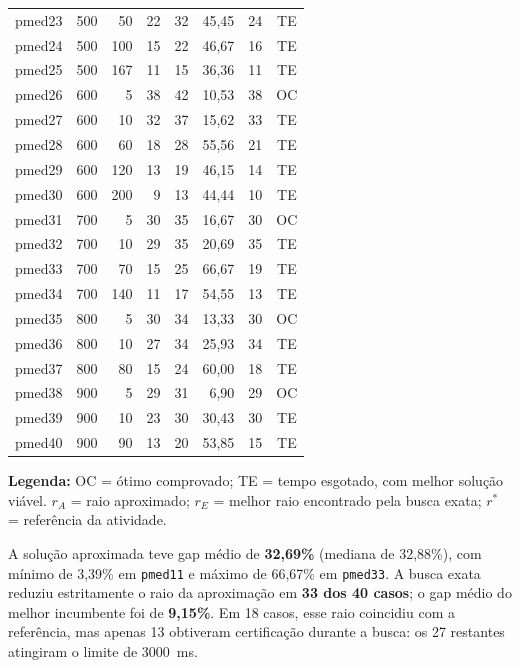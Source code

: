 \documentclass[12pt,a4paper]{article}
\begin{document}
\begin{longtable}{@{}lrrrrrrc@{}}
pmed23 & 500 & 50 & 22 & 32 & 45,45 & 24 & TE \\
pmed24 & 500 & 100 & 15 & 22 & 46,67 & 16 & TE \\
pmed25 & 500 & 167 & 11 & 15 & 36,36 & 11 & TE \\
pmed26 & 600 & 5 & 38 & 42 & 10,53 & 38 & OC \\
pmed27 & 600 & 10 & 32 & 37 & 15,62 & 33 & TE \\
pmed28 & 600 & 60 & 18 & 28 & 55,56 & 21 & TE \\
pmed29 & 600 & 120 & 13 & 19 & 46,15 & 14 & TE \\
pmed30 & 600 & 200 & 9 & 13 & 44,44 & 10 & TE \\
pmed31 & 700 & 5 & 30 & 35 & 16,67 & 30 & OC \\
pmed32 & 700 & 10 & 29 & 35 & 20,69 & 35 & TE \\
pmed33 & 700 & 70 & 15 & 25 & 66,67 & 19 & TE \\
pmed34 & 700 & 140 & 11 & 17 & 54,55 & 13 & TE \\
pmed35 & 800 & 5 & 30 & 34 & 13,33 & 30 & OC \\
pmed36 & 800 & 10 & 27 & 34 & 25,93 & 34 & TE \\
pmed37 & 800 & 80 & 15 & 24 & 60,00 & 18 & TE \\
pmed38 & 900 & 5 & 29 & 31 & 6,90 & 29 & OC \\
pmed39 & 900 & 10 & 23 & 30 & 30,43 & 30 & TE \\
pmed40 & 900 & 90 & 13 & 20 & 53,85 & 15 & TE \\
\bottomrule
\end{longtable}
\noindent\textbf{Legenda:} OC = ótimo comprovado; TE = tempo esgotado,
com melhor solução viável. $r_A$ = raio aproximado; $r_E$ = melhor raio
encontrado pela busca exata; $r^*$ = referência da atividade.

A solução aproximada teve gap médio de \textbf{32,69\%}
(mediana de 32,88\%), com mínimo de 3,39\% em
\texttt{pmed11} e máximo de 66,67\% em \texttt{pmed33}.
A busca exata reduziu estritamente o raio da aproximação em
\textbf{33 dos 40 casos}; o gap médio do melhor incumbente foi de
\textbf{9,15\%}. Em 18 casos, esse raio coincidiu com
a referência, mas apenas 13 obtiveram certificação durante a busca:
os 27 restantes atingiram o limite de 3000~ms.
\end{document}
